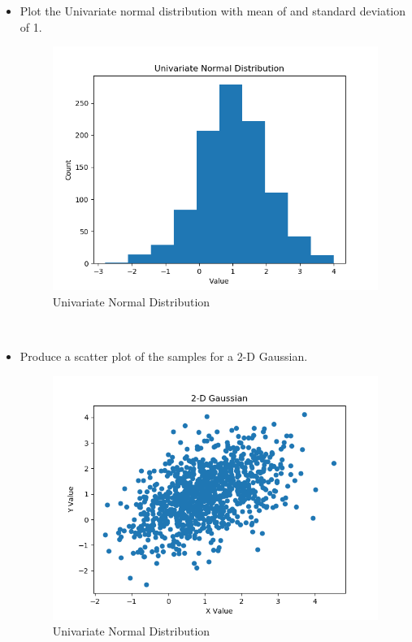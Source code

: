\documentclass{article}
\begin{document}
\begin{itemize}
\item Plot the Univariate normal distribution with mean of and standard deviation of 1.\\
\begin{figure}[h!]
	\centering
	\includegraphics[scale = 0.5]{Univariate_distribution.png}
	\caption{Univariate Normal Distribution}
\end{figure}\\
\pagebreak
\item Produce a scatter plot of the samples for a 2-D Gaussian.\\
\begin{figure}[h!]
	\centering
	\includegraphics[scale = 0.7]{GaussianScatterPlot.png}
	\caption{Univariate Normal Distribution}
\end{figure}\\


\end{itemize}
\end{document}
